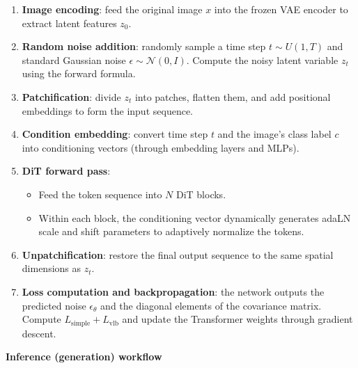 \begin{enumerate}
\def\labelenumi{\arabic{enumi}.}
\tightlist
\item
  \textbf{Image encoding}: feed the original image \(x\) into the frozen VAE encoder to extract latent features \(z_0\).
\item
  \textbf{Random noise addition}: randomly sample a time step \(t\sim U(1,T)\) and standard Gaussian noise \(\epsilon\sim\mathcal{N}(0,I)\). Compute the noisy latent variable \(z_t\) using the forward formula.
\item
  \textbf{Patchification}: divide \(z_t\) into patches, flatten them, and add positional embeddings to form the input sequence.
\item
  \textbf{Condition embedding}: convert time step \(t\) and the image's class label \(c\) into conditioning vectors (through embedding layers and MLPs).
\item
{}
  \textbf{DiT forward pass}:

  \begin{itemize}
  \tightlist
  \item
    Feed the token sequence into \(N\) DiT blocks.
  \item
    Within each block, the conditioning vector dynamically generates adaLN scale and shift parameters to adaptively normalize the tokens.
  \end{itemize}
\item
  \textbf{Unpatchification}: restore the final output sequence to the same spatial dimensions as \(z_t\).
\item
  \textbf{Loss computation and backpropagation}: the network outputs the predicted noise \(\epsilon_\theta\) and the diagonal elements of the covariance matrix. Compute \(L_{\mathrm{simple}}+L_{\mathrm{vlb}}\) and update the Transformer weights through gradient descent.
\end{enumerate}

\textbf{Inference (generation) workflow}

